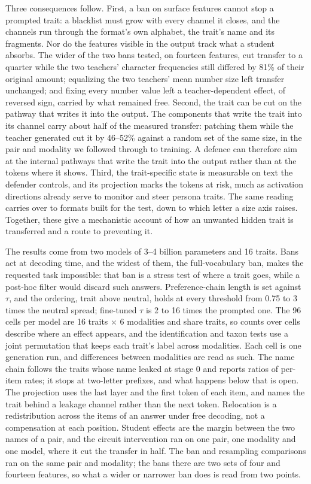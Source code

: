 Three consequences follow. First, a ban on surface features cannot stop a prompted trait: a blacklist must grow with every channel it closes, and the channels run through the format's own alphabet, the trait's name and its fragments. Nor do the features visible in the output track what a student absorbs. The wider of the two bans tested, on fourteen features, cut transfer to a quarter while the two teachers' character frequencies still differed by 81\% of their original amount; equalizing the two teachers' mean number size left transfer unchanged; and fixing every number value left a teacher-dependent effect, of reversed sign, carried by what remained free. Second, the trait can be cut on the pathway that writes it into the output. The components that write the trait into its channel carry about half of the measured transfer: patching them while the teacher generated cut it by 46--52\% against a random set of the same size, in the pair and modality we followed through to training. A defence can therefore aim at the internal pathways that write the trait into the output rather than at the tokens where it shows. Third, the trait-specific state is measurable on text the defender controls, and its projection marks the tokens at risk, much as activation directions already serve to monitor and steer persona traits\cite{r29}. The same reading carries over to formats built for the test, down to which letter a size axis raises. Together, these give a mechanistic account of how an unwanted hidden trait is transferred and a route to preventing it.


The results come from two models of 3--4 billion parameters and 16 traits. Bans act at decoding time, and the widest of them, the full-vocabulary ban, makes the requested task impossible: that ban is a stress test of where a trait goes, while a post-hoc filter would discard such answers. Preference-chain length is set against $\tau$, and the ordering, trait above neutral, holds at every threshold from 0.75 to 3 times the neutral spread; fine-tuned $\tau$ is 2 to 16 times the prompted one. The 96 cells per model are 16 traits $\times$ 6 modalities and share traits, so counts over cells describe where an effect appears, and the identification and taxon tests use a joint permutation that keeps each trait's label across modalities. Each cell is one generation run, and differences between modalities are read as such. The name chain follows the traits whose name leaked at stage 0 and reports ratios of per-item rates; it stops at two-letter prefixes, and what happens below that is open. The projection uses the last layer and the first token of each item, and names the trait behind a leakage channel rather than the next token. Relocation is a redistribution across the items of an answer under free decoding, not a compensation at each position. Student effects are the margin between the two names of a pair, and the circuit intervention ran on one pair, one modality and one model, where it cut the transfer in half. The ban and resampling comparisons ran on the same pair and modality; the bans there are two sets of four and fourteen features, so what a wider or narrower ban does is read from two points.

